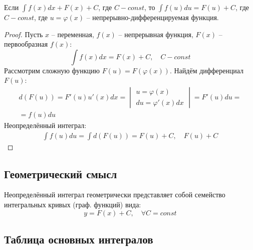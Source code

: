 \begin{property}
    Если $\int f(x) dx + F(x) + C$, где $C - const$, то $\int f(u) du = F(u) + C$, где $C - const$, где $u = \varphi(x)$ -- непрерывно-дифференцируемая функция.      
\end{property}
\begin{proof}
    Пусть $x$ -- переменная, $f(x)$ -- непрерывная функция, $F(x)$ -- первообразная $f(x)$: \[
        \int f(x) dx = F(x) + C, \quad C - const
    \]
    Рассмотрим сложную функцию $F(u) = F(\varphi(x))$.
    Найдём дифференциал $F(u)$: 
    \begin{gather*}
        d(F(u)) = F'(u) u'(x) dx = \begin{vmatrix}
            u = \varphi(x) \\
            du = \varphi'(x) dx
        \end{vmatrix} = F'(u) du = \\
        = f(u)du
    \end{gather*}
    Неопределённый интеграл:
    \begin{align*}
        \int f(u) du = \int d(F(u)) = F(u) + C, \quad F(u) + C
    \end{align*}
\end{proof}

\subsection{Геометрический смысл}


Неопределённый интеграл геометрически представляет собой семейство \\
интегральных кривых (граф. функций) вида: \[
    y = F(x) + C, \quad \forall C = const
\]
 
\subsection{Таблица основных интегралов}

